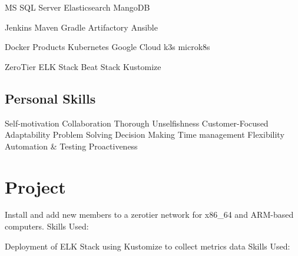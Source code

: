\documentclass[]{openfont}
\begin{document}
\begin{minipage}[t]{0.33\textwidth}
\textbullet{}MS SQL Server 
\textbullet{}Elasticsearch
\textbullet{}MangoDB

\textbullet{}Jenkins 
\textbullet{}Maven
\textbullet{}Gradle
\textbullet{}Artifactory
\textbullet{}Ansible

\textbullet{}Docker Products 
\textbullet{}Kubernetes
\textbullet{}Google Cloud
\textbullet{}k3s
\textbullet{}microk8s

\textbullet{}ZeroTier
\textbullet{}ELK Stack 
\textbullet{}Beat Stack
\textbullet{}Kustomize

\sectionsep

\subsection{Personal Skills}

\textbullet{}Self-motivation 
\textbullet{}Collaboration 
\textbullet{}Thorough
\textbullet{}Unselfishness
\textbullet{}Customer-Focused
\textbullet{}Adaptability 
\textbullet{}Problem Solving 
\textbullet{}Decision Making 
\textbullet{}Time management
\textbullet{}Flexibility
\textbullet{}Automation \& Testing
\textbullet{}Proactiveness

\sectionsep


\section{Project}

Install and add new members to a zerotier network for x86\_64 and ARM-based computers.
Skills Used: 
\sectionsep

Deployment of ELK Stack using Kustomize to collect metrics data
Skills Used: 
\sectionsep

%
%

\end{minipage} 
\end{document}

